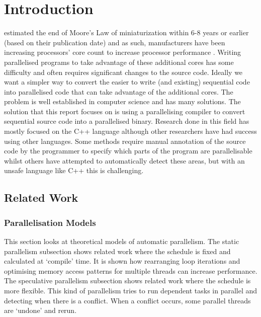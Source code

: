 \chapter{Introduction}
\textcite{Kish2002} estimated the end of Moore's Law of miniaturization within 6-8 years or earlier (based on their publication date) and as such, manufacturers have been increasing processors' core count to increase processor performance \parencite{Geer2005}. Writing parallelised programs to take advantage of these additional cores has some difficulty and often requires significant changes to the source code. Ideally we want a simpler way to convert the easier to write (and existing) sequential code into parallelised code that can take advantage of the additional cores. The problem is well established in computer science and has many solutions. The solution that this report focuses on is using a parallelising compiler to convert sequential source code into a parallelised binary. Research done in this field has mostly focused on the C++ language although other researchers have had success using other languages. Some methods require manual annotation of the source code by the programmer to specify which parts of the program are parallelisable whilst others have attempted to automatically detect these areas, but with an unsafe language like C++ this is challenging.

\section{Related Work}
\label{sec:related-work}

\subsection{Parallelisation Models}
\label{sec:related-models}
This section looks at theoretical models of automatic parallelism. The static parallelism subsection shows related work where the schedule is fixed and calculated at `compile' time. It is shown how rearranging loop iterations and optimising memory access patterns for multiple threads can increase performance. The speculative parallelism subsection shows related work where the schedule is more flexible. This kind of parallelism tries to run dependent tasks in parallel and detecting when there is a conflict. When a conflict occurs, some parallel threads are `undone' and rerun.

